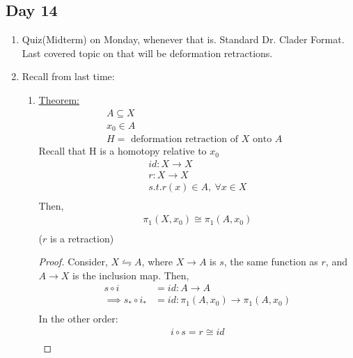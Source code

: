 \subsection{Day 14}
\begin{enumerate}
    \item Quiz(Midterm) on Monday, whenever that is. Standard Dr. Clader Format. Last
        covered topic on that will be deformation retractions.
    \item Recall from last time:
        \begin{enumerate}
            \item \underline{Theorem: }
                \begin{align*}
                    A\subseteq X\\
                    x_0 \in A\\
                    H=\text{ deformation retraction of $X$ onto $A$ }
                \end{align*}
                Recall that H is a homotopy relative to $x_0$
                \begin{align*}
                    id: X\rightarrow X\\
                    r: X \rightarrow X\\
                    s.t. r(x)\in A,\ \forall x\in X\\
                \end{align*}
                Then,
                \begin{align*}
                    \pi_1(X,x_0)\cong\pi_1(A,x_0)\\
                \end{align*}
                ($r$ is a retraction)
                \begin{proof}
                    Consider, $X \leftrightharpoons A$, where
                    $X\rightarrow A$ is $s$, the same function as $r$,
                    and $A\rightarrow X$ is the inclusion map. Then,
                    \begin{align*}
                        s\circ i &= id: A\rightarrow A\\
                        \implies s_* \circ i_* &= id: \pi_1(A,x_0)\rightarrow\pi_1(A,x_0)\\
                    \end{align*}
                    In the other order:
                    \begin{align*}
                        i\circ s = r\cong id\\

\end{align*}
\end{proof}
\end{enumerate}
\end{enumerate}
